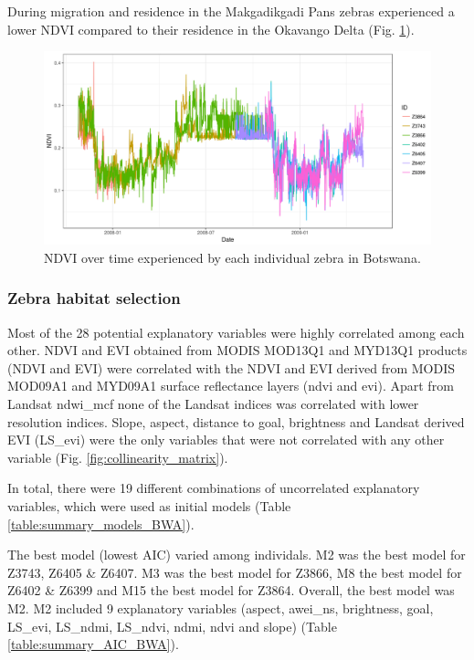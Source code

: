 \documentclass[12pt,a4paper, twoside, english]{article}
\begin{document}
During migration and residence in the Makgadikgadi Pans zebras experienced a lower NDVI compared to their residence in the Okavango Delta (Fig. \ref{fig:zebra_ndvi_bwa}).

\begin{figure}[H]
  \centering
  \includegraphics[width=\textwidth]{figures/Zebra_ndvi_BWA.png}
  \caption[NDVI over time experienced by Ngamiland's zebras]{NDVI over time experienced by each individual zebra in Botswana.}
  \label{fig:zebra_ndvi_bwa}
\end{figure}

\subsubsection{Zebra habitat selection}


Most of the 28 potential explanatory variables were highly correlated among each other. NDVI and EVI obtained from MODIS MOD13Q1 and MYD13Q1 products (NDVI and EVI) were correlated with the NDVI and EVI derived from MODIS MOD09A1 and MYD09A1 surface reflectance layers (ndvi and evi). Apart from Landsat ndwi\_mcf none of the Landsat indices was correlated with lower resolution indices. Slope, aspect, distance to goal, brightness and Landsat derived EVI (LS\_evi) were the only variables that were not correlated with any other variable (Fig. \ref{fig:collinearity_matrix}). 

In total, there were 19 different combinations of uncorrelated explanatory variables, which were used as initial models (Table \ref{table:summary_models_BWA}).

The best model (lowest AIC) varied among individals. M2 was the best model for Z3743, Z6405 \& Z6407. M3 was the best model for Z3866, M8 the best model for Z6402 \& Z6399 and M15 the best model for Z3864. Overall, the best model was M2. M2 included 9 explanatory variables (aspect, awei\_ns, brightness, goal, LS\_evi, LS\_ndmi, LS\_ndvi, ndmi, ndvi and slope) (Table \ref{table:summary_AIC_BWA}).
\end{document}
